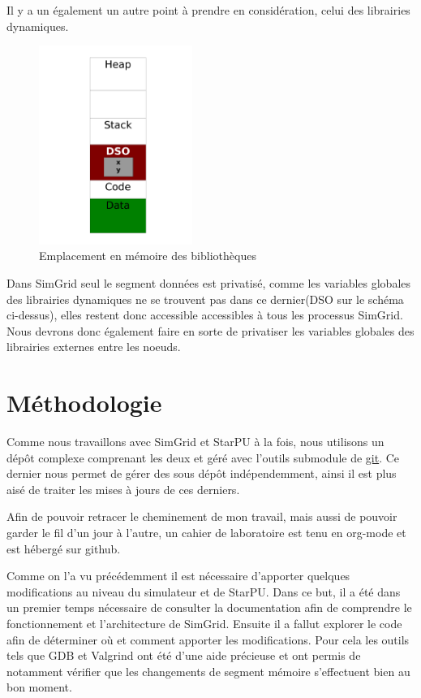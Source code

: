 \documentclass[smallextended]{svjour3}
\begin{document}
Il y a un également un autre point à prendre en considération,
celui des librairies dynamiques. 

\begin{figure}[htb]
\centering
\includegraphics[width=5cm]{./Img/Dyn.pdf}
\caption{\label{fig:2}Emplacement en mémoire des bibliothèques}
\end{figure}

Dans SimGrid seul le segment données est privatisé, comme les
variables globales des librairies dynamiques ne se trouvent pas
dans ce dernier(DSO sur le schéma ci-dessus), elles restent donc
accessible accessibles à tous les processus SimGrid. Nous devrons donc
également faire en sorte de privatiser les variables globales des
librairies externes entre les noeuds. 

\section{Méthodologie}
\label{sec-4}
Comme nous travaillons avec SimGrid et StarPU à la fois, nous
utilisons un dépôt complexe comprenant les deux et géré avec
l'outils submodule de \href{https://github.com/swhatelse/Journal}{git}. Ce dernier nous permet de gérer des sous
dépôt indépendemment, ainsi il est plus aisé de traiter les mises à
jours de ces derniers.

Afin de pouvoir retracer le cheminement de mon travail, mais aussi
de pouvoir garder le fil d'un jour à l'autre, un cahier de
laboratoire est tenu en org-mode et est hébergé sur github.

Comme on l'a vu précédemment il est nécessaire d'apporter quelques
modifications au niveau du simulateur et de StarPU. Dans ce but, il
a été dans un premier temps nécessaire de consulter la documentation
afin de comprendre le fonctionnement et l'architecture de
SimGrid. Ensuite il a fallut explorer le code afin de déterminer où
et comment apporter les modifications. Pour cela les outils tels que
GDB et Valgrind ont été d'une aide précieuse et ont permis de notamment
vérifier que les changements de segment mémoire s'effectuent bien au
bon moment.
\end{document}
